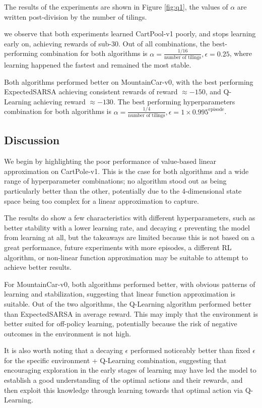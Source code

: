 \documentclass{article}
\begin{document}
The results of the experiments are shown in Figure \ref{fig:q1}, the values of $\alpha$ are
written post-division by the number of tilings.

we observe that both experiments learned CartPool-v1 poorly, and stops learning
early on, achieving rewards of sub-$30$. Out of all combinations, the best-performing combination for both
algorithms is $\alpha = \frac{1/16}{\text{number of tilings}}, \epsilon = 0.25$, where learning
happened the fastest and remained the most stable.

Both algorithms performed better on MountainCar-v0, with the best performing ExpectedSARSA achieving consistent rewards of
reward $\approx -150$, and Q-Learning achieving reward $\approx -130$. The best performing hyperparameters
combination for both algorithms is $\alpha = \frac{1/4}{\text{number of tilings}}, \epsilon = 1\times
0.995^{\text{episode}}$.

\subsection{Discussion}
We begin by highlighting the poor performance of value-based linear approximation on CartPole-v1. This is
the case for both algorithms and a wide range of hyperparameter combinations; no algorithm
stood out as being particularly better than the other, potentially due to the 4-dimensional state space being too complex for a linear approximation to capture.

The results do show a few characteristics with different hyperparameters, such as better stability with a
lower learning rate, and decaying $\epsilon$ preventing the model from learning at all, but
the takeaways are limited because this is not based on a great performance,
future experiments with more episodes, a different RL algorithm, or non-linear function approximation
may be suitable to attempt to achieve better results.

For MountainCar-v0, both algorithms performed better, with obvious patterns of learning and
stabilization, suggesting that linear function approximation is suitable.
Out of the two algorithms, the Q-Learning algorithm performed better than ExpectedSARSA in average reward.
This may imply that the environment is better suited for off-policy learning, potentially
because the risk of negative outcomes in the environment is not high.

It is also worth noting that a decaying $\epsilon$ performed noticeably better than fixed $\epsilon$
for the specific environment + Q-Learning combination, suggesting that encouraging exploration
in the early stages of learning may have led the model to establish a good understanding of the
optimal actions and their rewards, and then exploit this knowledge through learning towards that
optimal action via Q-Learning.
\end{document}
